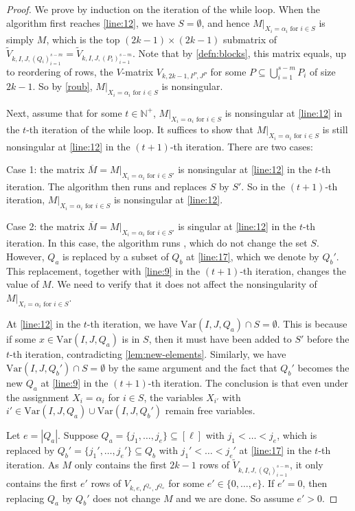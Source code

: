 \documentclass[11pt]{article}
\theoremstyle{plain}
\theoremstyle{definition}
\theoremstyle{remark}
\newcommand{\N}{\mathbb{N}}
\newcommand{\var}{\mathrm{Var}}
\begin{document}
\begin{proof}
We prove by induction on the iteration of the while loop. When the algorithm first reaches \cref{line:12}, we have $S=\emptyset$, and hence $M|_{X_i=\alpha_i \text{ for } i\in S}$ is simply $M$, which is the top $(2k-1)\times (2k-1)$ submatrix of $\widetilde{V}_{k,I,J,(Q_i)_{i=1}^{s-m}}=\widetilde{V}_{k,I,J,(P_i)_{i=1}^{s-m}}$.
Note that by \cref{defn:blocks}, this matrix equals, up to reordering of rows, the $V$-matrix $V_{k,2k-1,I^P,J^P}$ for some $P\subseteq \bigcup_{i=1}^{s-m} P_i$ of size $2k-1$.
So by \cref{roub}, $M|_{X_i=\alpha_i \text{ for } i\in S}$ is nonsingular.

Next, assume that for some $t\in\N^+$, $M|_{X_i=\alpha_i \text{ for } i\in S}$ is nonsingular at \cref{line:12} in the $t$-th iteration of the while loop. It suffices to show that $M|_{X_i=\alpha_i \text{ for } i\in S}$ is still nonsingular at \cref{line:12} in the $(t+1)$-th iteration. There are two cases:

Case 1: the matrix $\overline{M}=M|_{X_i=\alpha_i \text{ for } i\in S'}$ is nonsingular at \cref{line:12} in the $t$-th iteration.
The algorithm then runs  and replaces $S$ by $S'$.
So in the $(t+1)$-th iteration, $M|_{X_i=\alpha_i \text{ for } i\in S}$ is nonsingular at \cref{line:12}.

Case 2: the matrix $\overline{M}=M|_{X_i=\alpha_i \text{ for } i\in S'}$ is singular at \cref{line:12} in the $t$-th iteration.
In this case, the algorithm runs , which do not change the set $S$. However, $Q_a$ is replaced by a subset of $Q_b$ at \cref{line:17}, which we denote by $Q_b'$. This replacement, together with \cref{line:9} in the $(t+1)$-th iteration, changes the value of $M$. We need to verify that it does not affect the nonsingularity of $M|_{X_i=\alpha_i \text{ for } i\in S}$. 

At \cref{line:12} in the $t$-th iteration, we have $\var(I,J,Q_a)\cap S=\emptyset$. This is because if some $x\in\var(I,J, Q_a)$ is in $S$, then it must have been added to $S'$ before the $t$-th iteration, contradicting \cref{lem:new-elements}.
Similarly, we have  $\var(I,J,Q_b')\cap S=\emptyset$ by the same argument and the fact that $Q_b'$ becomes the new $Q_a$ at \cref{line:9} in the $(t+1)$-th iteration. 
The conclusion is that even under the assignment $X_i=\alpha_i$ for $i\in S$, the variables $X_{i'}$ with $i'\in \var(I,J,Q_a)\cup \var(I,J,Q_b')$ remain free variables.

Let $e=|Q_a|$.
Suppose $Q_a=\{j_1,\dots,j_e\}\subseteq [\ell]$ with $j_1<\dots<j_e$, which is replaced by $Q_b'=\{j_1',\dots,j_e'\}\subseteq Q_b$ with $j_1'<\dots<j_e'$ at \cref{line:17} in the $t$-th iteration.
As $M$ only contains the first $2k-1$ rows of $\widetilde{V}_{k,I,J,(Q_i)_{i=1}^{s-m}}$,
it only contains the first $e'$ rows of $V_{k,e,I^{Q_a},J^{Q_a}}$ for some $e'\in\{0,\dots,e\}$. If $e'=0$, then replacing $Q_a$ by $Q_b'$ does not change $M$ and we are done. So assume $e'>0$.


\end{proof}
\end{document}
